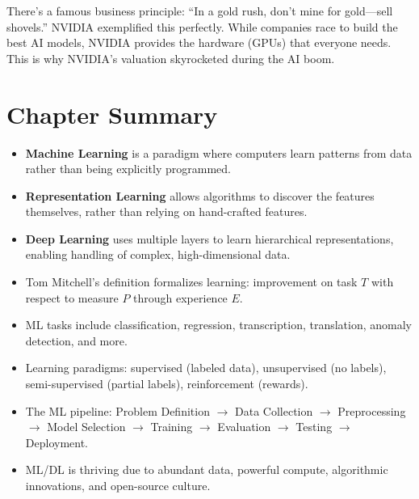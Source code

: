 \begin{bluebox}
There's a famous business principle: ``In a gold rush, don't mine for gold---sell shovels.'' NVIDIA exemplified this perfectly. While companies race to build the best AI models, NVIDIA provides the hardware (GPUs) that everyone needs. This is why NVIDIA's valuation skyrocketed during the AI boom.
\end{bluebox}


\section{Chapter Summary}

\begin{itemize}
    \item \textbf{Machine Learning} is a paradigm where computers learn patterns from data rather than being explicitly programmed.
    
    \item \textbf{Representation Learning} allows algorithms to discover the features themselves, rather than relying on hand-crafted features.
    
    \item \textbf{Deep Learning} uses multiple layers to learn hierarchical representations, enabling handling of complex, high-dimensional data.
    
    \item Tom Mitchell's definition formalizes learning: improvement on task $T$ with respect to measure $P$ through experience $E$.
    
    \item ML tasks include classification, regression, transcription, translation, anomaly detection, and more.
    
    \item Learning paradigms: supervised (labeled data), unsupervised (no labels), semi-supervised (partial labels), reinforcement (rewards).
    
    \item The ML pipeline: Problem Definition $\rightarrow$ Data Collection $\rightarrow$ Preprocessing $\rightarrow$ Model Selection $\rightarrow$ Training $\rightarrow$ Evaluation $\rightarrow$ Testing $\rightarrow$ Deployment.
    
    \item ML/DL is thriving due to abundant data, powerful compute, algorithmic innovations, and open-source culture.
\end{itemize}
